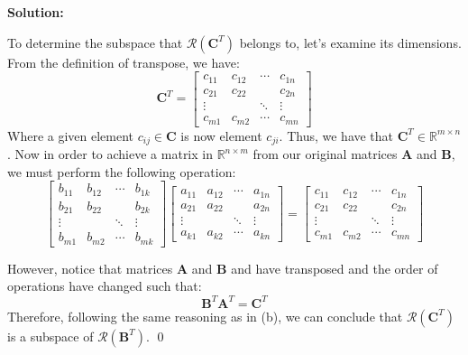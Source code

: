 \begin{enumerate}[label=(\alph*)]
	      \par \textbf{Solution:}
	      \par To determine the subspace that $\mathcal{R}\left( \mathbf{C}^T
		      \right)$ belongs to, let's examine its dimensions. From the definition
	      of transpose, we have:
	      $$
		      \mathbf{C}^T  =
		      \left[\begin{array}{cccc}
				      c_{11}  & c_{12}  & \cdots & c_{1 n} \\
				      c_{21}  & c_{22}  &        & c_{2 n} \\
				      \vdots  &         & \ddots & \vdots  \\
				      c_{m 1} & c_{m 2} & \cdots & c_{m n}
			      \end{array}\right]
	      $$
	      Where a given element $c_{ij} \in \mathbf{C}$ is now element $c_{ji}$.
	      Thus, we have that $\mathbf{C}^T \in \mathbb{R}^{m \times n}$. Now in
	      order to achieve a matrix in $\mathbb{R}^{n \times m}$ from our
	      original matrices $\mathbf{A}$ and $\mathbf{B}$, we must perform the
	      following operation:
	      $$
		      \left[\begin{array}{cccc}
				      b_{11}  & b_{12}  & \cdots & b_{1 k} \\
				      b_{21}  & b_{22}  &        & b_{2 k} \\
				      \vdots  &         & \ddots & \vdots  \\
				      b_{m 1} & b_{m 2} & \cdots & b_{m k}
			      \end{array}\right]
		      \left[\begin{array}{cccc}
				      a_{11}  & a_{12} & \cdots & a_{1 n} \\
				      a_{21}  & a_{22} &        & a_{2 n} \\
				      \vdots  &        & \ddots & \vdots  \\
				      a_{k 1} & a_{k2} & \cdots & a_{k n}
			      \end{array}\right]
		      =
		      \left[\begin{array}{cccc}
				      c_{11}  & c_{12}  & \cdots & c_{1 n} \\
				      c_{21}  & c_{22}  &        & c_{2 n} \\
				      \vdots  &         & \ddots & \vdots  \\
				      c_{m 1} & c_{m 2} & \cdots & c_{m n}
			      \end{array}\right]
	      $$

	      However, notice that matrices
	      $\mathbf{A}$ and $\mathbf{B}$ and have transposed and the order of
	      operations have changed such that:
	      $$ \mathbf{B}^T \mathbf{A}^T = \mathbf{C}^T $$
	      Therefore, following the same reasoning as in (b), we can conclude
	      that $\mathcal{R}\left( \mathbf{C}^T \right)$ is a subspace of
	      $\mathcal{R}\left(\mathbf{B}^T \right)$. \qed

\end{enumerate}
